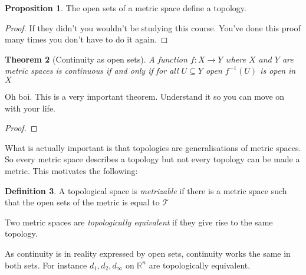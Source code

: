 \documentclass[11pt,a4paper]{article}
\newtheorem{theorem}{Theorem}[section]
\theoremstyle{definition}
\newtheorem{definition}[theorem]{Definition}
\newtheorem{prop}[theorem]{Proposition}
\begin{document}
\begin{prop}
The open sets of a metric space define a topology. 
\end{prop}
\begin{proof}
If they didn't you wouldn't be studying this course. You've done this proof many times you don't have to do it again.
\end{proof}


\begin{theorem}[Continuity as open sets]

A function $f: X \longrightarrow Y$ where $X$ and $Y$ are metric spaces is continuous if and only if for all $U\subseteq Y$ open $f^{-1}(U)$ is open in $X$

\end{theorem}

Oh boi. This is a very important theorem. Understand it so you can move on with your life.


\begin{proof}


\end{proof}

What is actually important is that topologies are generalisations of metric spaces. So every metric space describes a topology but not every topology can be made a metric. This motivates the following:


\begin{definition}
A topological space is \emph{metrizable} if there is a metric space such that the open sets of the metric is equal to $\mathcal{T}$

Two metric spaces are \emph{topologically equivalent} if they give rise to the same topology. 
\end{definition}

As continuity is in reality expressed by open sets, continuity works the same in both sets. For instance $d_1, d_2, d_\infty$ on $\mathbb{R}^n$ are topologically equivalent.
\end{document}
